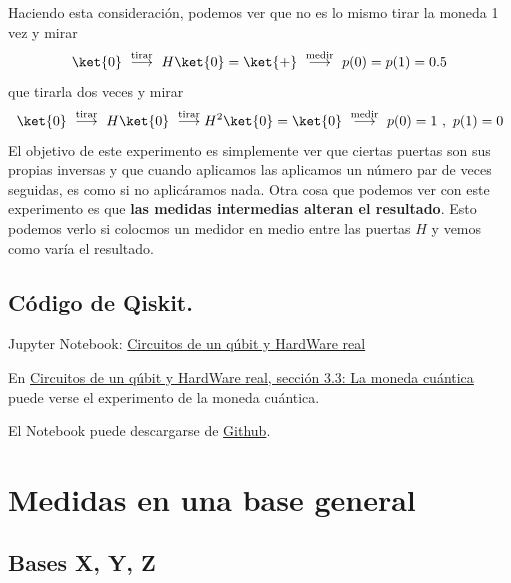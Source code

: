 \documentclass[a4paper,11pt]{book} %
\numberwithin{equation}{chapter}
\begin{document}
Haciendo esta consideración, podemos ver que no es lo mismo tirar la moneda 1 vez y mirar 
\begin{equation}
\ket{0}~ \stackrel{\rm tirar}{\longrightarrow} ~ H \ket{0}= \ket{+} ~ \stackrel{\rm medir}{\longrightarrow} ~p(0) = p(1) = 0.5
\end{equation}
que tirarla dos veces y mirar
\begin{equation}
\ket{0}~ \stackrel{\rm tirar}{\longrightarrow} ~ H \ket{0}~ \stackrel{\rm tirar}{\longrightarrow} H^2\ket{0} = \ket{0} ~ \stackrel{\rm medir}{\longrightarrow} ~p(0) = 1 ~,~p(1) = 0
\end{equation}
El objetivo de este experimento es simplemente ver que ciertas puertas son sus propias inversas y que cuando aplicamos las aplicamos un número par de veces seguidas, es como si no aplicáramos nada. Otra cosa que podemos ver con este experimento es que \textbf{las medidas intermedias alteran el resultado}. Esto podemos verlo si colocmos un medidor en medio entre las puertas $H$ y vemos como varía el resultado.



		\subsection{Código de Qiskit.}
		
	\begin{mybox_orange}{Jupyter Notebook: \href{https://www.scbi.uma.es/web/wp-content/uploads/Jupyterbook/CICC_UMA/Notebooks/html/docs/Part_01/Chapter_03-Circuitos_1_qubit_medidas_y_RealHardware_myst.html}{Circuitos de un qúbit y HardWare real}}
	
	En \href{https://www.scbi.uma.es/web/wp-content/uploads/Jupyterbook/CICC_UMA/Notebooks/html/docs/Part_01/Chapter_03-Circuitos_1_qubit_medidas_y_RealHardware_myst.html#la-moneda-cuantica}{Circuitos de un qúbit y HardWare real, sección 3.3: La moneda cuántica} puede verse el experimento de la moneda cuántica.
	
	El Notebook puede descargarse de \href{https://github.com/davidcb98/CICC_UMA/blob/master/Notebooks/Part_01/Chapter_03-Circuitos_1_qubit_medidas_y_RealHardware.ipynb}{Github}.
	\end{mybox_orange}
    
    
    \section{Medidas en una base general}
        \subsection{Bases X, Y, Z} \label{sec_subsub_medidad1_bases_xyz}
       
\end{document}
